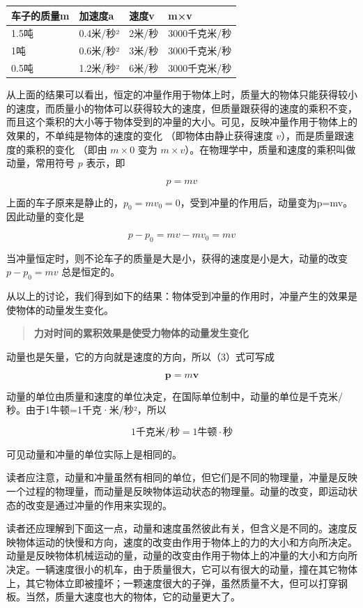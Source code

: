 {\def\LTcaptype{none} %
\begin{longtable}[]{@{}llll@{}}
\toprule\noalign{}
车子的质量m & 加速度a & 速度v & m×v \\
\midrule\noalign{}
\endhead
\bottomrule\noalign{}
\endlastfoot
1.5吨 & 0.4米/秒² & 2米/秒 & 3000千克米/秒 \\
1吨 & 0.6米/秒² & 3米/秒 & 3000千克米/秒 \\
0.5吨 & 1.2米/秒² & 6米/秒 & 3000千克米/秒 \\
\end{longtable}
}

从上面的结果可以看出，恒定的冲量作用于物体上时，质量大的物体只能获得较小的速度，而质量小的物体可以获得较大的速度，但质量跟获得的速度的乘积不变，而且这个乘积的大小等于物体受到的冲量的大小。可见，反映冲量作用于物体上的效果的，不单纯是物体的速度的变化
（即物体由静止获得速度 \(v\)），而是质量跟速度的乘积的变化 （即由
\(m \times 0\) 变为
\(m \times v\)）。在物理学中，质量和速度的乘积叫做动量，常用符号 \(p\)
表示，即

\[
p = m v \tag{12.3}
\]

上面的车子原来是静止的，\(p_{0}=mv_{0}=0\)，受到冲量的作用后，动量变为p=mv。因此动量的变化是

\[
p - p _ {0} = m v - m v _ {0} = m v
\]

当冲量恒定时，则不论车子的质量是大是小，获得的速度是小是大，动量的改变
\(p - p_0 = mv\) 总是恒定的。

从以上的讨论，我们得到如下的结果：物体受到冲量的作用时，冲量产生的效果是使物体的动量发生变化。

\begin{quote}
\textbf{力对时间的累积效果是使受力物体的动量发生变化}
\end{quote}

动量也是矢量，它的方向就是速度的方向，所以（3）式可写成

\[
\boldsymbol {p} = m \boldsymbol {v} \tag{12.4}
\]

动量的单位由质量和速度的单位决定，在国际单位制中，动量的单位是千克米/秒。由于1牛顿=1千克·米/秒²，所以

\[
1 \text{千克米} / \text{秒} = 1 \text{牛顿} \cdot \text{秒}
\]

可见动量和冲量的单位实际上是相同的。

读者应注意，动量和冲量虽然有相同的单位，但它们是不同的物理量，冲量是反映一个过程的物理量，而动量是反映物体运动状态的物理量。动量的改变，即运动状态的改变是通过冲量的作用来实现的。

读者还应理解到下面这一点，动量和速度虽然彼此有关，但含义是不同的。速度反映物体运动的快慢和方向，速度的改变由作用于物体上的力的大小和方向所决定。动量是反映物体机械运动的量，动量的改变由作用于物体上的冲量的大小和方向所决定。一辆速度很小的机车，由于质量很大，它可以有很大的动量，撞在其它物体上，其它物体立即被撞坏；一颗速度很大的子弹，虽然质量不大，但可以打穿钢板。当然，质量大速度也大的物体，它的动量更大了。

